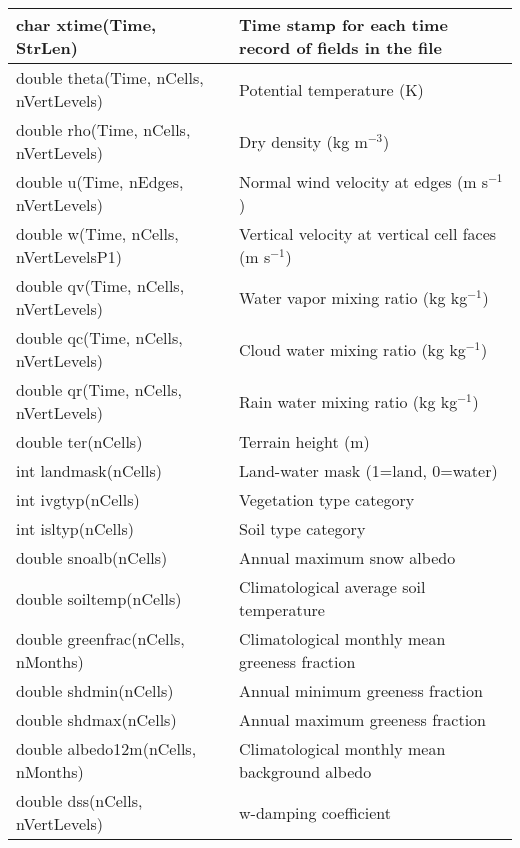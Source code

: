 {\small     
\begin{longtable}{|p{2.5in} |p{3.75in}|}
 \hline
        char xtime(Time, StrLen)     & Time stamp for each time record of fields in the file \\ \hline
        double \hfil\break theta(Time, nCells, nVertLevels)      &        Potential temperature (K) \\ \hline
        double rho(Time, nCells, nVertLevels)        &        Dry density (kg m$^{-3}$) \\ \hline
        double u(Time, nEdges, nVertLevels)         & Normal wind velocity at edges (m s$^{-1}$) \\ \hline
        double \hfil\break w(Time, nCells, nVertLevelsP1)       & Vertical velocity at vertical cell faces (m s$^{-1}$) \\ \hline
        double qv(Time, nCells, nVertLevels)   &              Water vapor mixing ratio (kg kg$^{-1}$) \\ \hline
        double qc(Time, nCells, nVertLevels)   &              Cloud water mixing ratio (kg kg$^{-1}$) \\ \hline
        double qr(Time, nCells, nVertLevels)   &              Rain water mixing ratio (kg kg$^{-1}$) \\ \hline
        double ter(nCells)           &  Terrain height (m) \\ \hline
        int landmask(nCells)         &  Land-water mask (1=land, 0=water) \\ \hline
        int ivgtyp(nCells)           &  Vegetation type category \\ \hline
        int isltyp(nCells)           &  Soil type category \\ \hline
        double snoalb(nCells)        &  Annual maximum snow albedo \\ \hline
        double soiltemp(nCells)      &  Climatological average soil temperature \\ \hline
        double greenfrac(nCells, nMonths)    & Climatological monthly mean greeness fraction \\ \hline
        double shdmin(nCells)                & Annual minimum greeness fraction \\ \hline
        double shdmax(nCells)                & Annual maximum greeness fraction \\ \hline
        double albedo12m(nCells, nMonths)    & Climatological monthly mean background albedo \\ \hline
        double dss(nCells, nVertLevels)         & w-damping coefficient \\ \hline

\end{longtable}}
